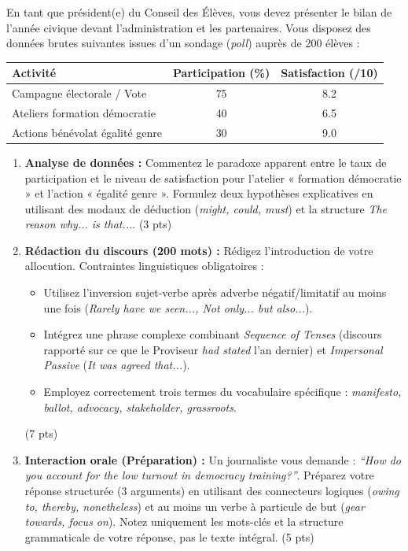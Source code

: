 \documentclass[11pt]{article}
\begin{document}
\begin{exercice}
En tant que président(e) du Conseil des Élèves, vous devez présenter le bilan de l'année civique devant l'administration et les partenaires. Vous disposez des données brutes suivantes issues d'un sondage (\textit{poll}) auprès de 200 élèves :

\begin{center}
\begin{tabular}{|l|c|c|}
\hline
\textbf{Activité} & \textbf{Participation (\%)} & \textbf{Satisfaction (/10)} \\
\hline
Campagne électorale / Vote & 75 & 8.2 \\
Ateliers formation démocratie & 40 & 6.5 \\
Actions bénévolat égalité genre & 30 & 9.0 \\
\hline
\end{tabular}
\end{center}

\begin{enumerate}
    \item \textbf{Analyse de données :} Commentez le paradoxe apparent entre le taux de participation et le niveau de satisfaction pour l'atelier « formation démocratie » et l'action « égalité genre ». Formulez deux hypothèses explicatives en utilisant des modaux de déduction (\textit{might, could, must}) et la structure \textit{The reason why... is that...}. (3 pts)
    \item \textbf{Rédaction du discours (200 mots) :} Rédigez l'introduction de votre allocution. Contraintes linguistiques obligatoires :
    \begin{itemize}
        \item Utilisez l'inversion sujet-verbe après adverbe négatif/limitatif au moins une fois (\textit{Rarely have we seen..., Not only... but also...}).
        \item Intégrez une phrase complexe combinant \textit{Sequence of Tenses} (discours rapporté sur ce que le Proviseur \textit{had stated} l'an dernier) et \textit{Impersonal Passive} (\textit{It was agreed that...}).
        \item Employez correctement trois termes du vocabulaire spécifique : \textit{manifesto, ballot, advocacy, stakeholder, grassroots}.
    \end{itemize} (7 pts)
    \item \textbf{Interaction orale (Préparation) :} Un journaliste vous demande : \textit{``How do you account for the low turnout in democracy training?''}. Préparez votre réponse structurée (3 arguments) en utilisant des connecteurs logiques (\textit{owing to, thereby, nonetheless}) et au moins un verbe à particule de but (\textit{gear towards, focus on}). Notez uniquement les mots-clés et la structure grammaticale de votre réponse, pas le texte intégral. (5 pts)
\end{enumerate}
\end{exercice}
\end{document}
